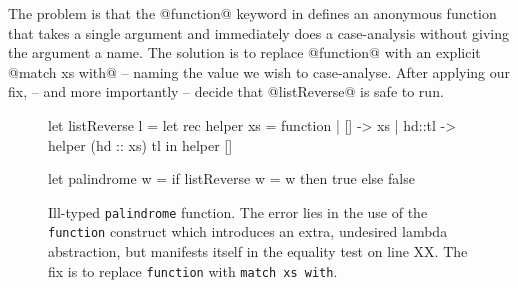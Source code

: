 The problem is that the @function@ keyword in \ocaml defines an
anonymous function that takes a single argument and immediately does a
case-analysis without giving the argument a name.
%
The solution is to replace @function@ with an explicit @match xs with@
-- naming the value we wish to case-analyse.
%
After applying our fix, \nanomaly -- and more importantly \ocaml --
decide that @listReverse@ is safe to run.
%
\begin{figure}[t]
\centering
\begin{code}
  let listReverse l =
    let rec helper xs = function 
      | [] -> xs 
      | hd::tl -> helper (hd :: xs) tl 
    in helper []
  
  let palindrome w =
    if listReverse w = w 
    then true 
    else false
\end{code}
\caption{Ill-typed \texttt{palindrome} function. The error lies in the
  use of the \texttt{function} construct which introduces an extra,
  undesired lambda abstraction, but manifests itself in the equality
  test on line XX. The fix is to replace \texttt{function} with
  \texttt{match xs with}. }
\label{fig:palindrome}
\end{figure}
%
